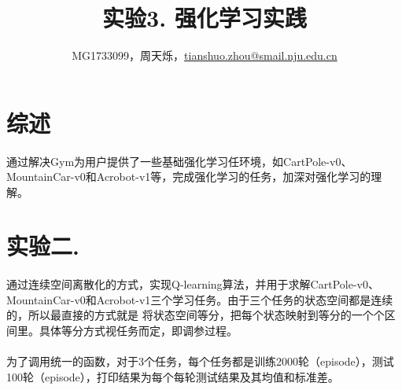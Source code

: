 \documentclass[a4paper,UTF8]{article}
\theoremstyle{definition}
\begin{document}
\title{实验3. 强化学习实践}
\author{MG1733099，周天烁，\url{tianshuo.zhou@smail.nju.edu.cn}}
\maketitle

\section{综述}
    \paragraph*{}
	通过解决Gym为用户提供了一些基础强化学习任环境，如CartPole-v0、MountainCar-v0和Acrobot-v1等，完成强化学习的任务，加深对强化学习的理解。


\section{实验二. }
    \paragraph*{}
    通过连续空间离散化的方式，实现Q-learning算法，并用于求解CartPole-v0、MountainCar-v0和Acrobot-v1三个学习任务。由于三个任务的状态空间都是连续的，所以最直接的方式就是
    将状态空间等分，把每个状态映射到等分的一个个区间里。具体等分方式视任务而定，即调参过程。
    \paragraph*{}
    为了调用统一的函数，对于3个任务，每个任务都是训练2000轮（episode），测试100轮（episode），打印结果为每个每轮测试结果及其均值和标准差。
\end{document}
